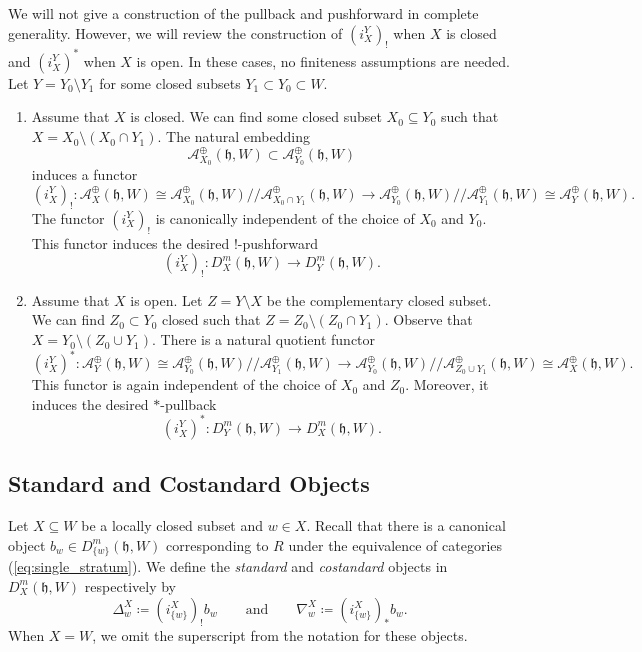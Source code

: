 \documentclass{amsart}
\newcommand{\scrA}{\mathcal{A}}
\newcommand{\BE}{D^m}
\newcommand{\fr}[1]{\mathfrak{#1}}
\theoremstyle{definition}
\begin{document}
        We will not give a construction of the pullback and pushforward in complete generality. However, we will review the construction of $(i_X^Y)_!$ when $X$ is closed and $(i_X^Y)^*$ when $X$ is open.
        In these cases, no finiteness assumptions are needed.
        Let $Y = Y_0 \setminus Y_1$ for some closed subsets $Y_1 \subset Y_0 \subset W$.
        \begin{enumerate}
                \item Assume that $X$ is closed. 
                We can find some closed subset $X_0 \subseteq Y_0$ such that $X = X_0 \setminus (X_0 \cap Y_1)$.
                The natural embedding
                \[\scrA^{\oplus}_{ X_0} (\fr{h}, W) \subset \scrA^{\oplus}_{ Y_0} (\fr{h}, W)\]
                induces a functor
                \[ (i_X^Y)_! : \scrA^{\oplus}_{ X} (\fr{h}, W) \cong \scrA^{\oplus}_{ X_0} (\fr{h}, W) /\!\!/ \scrA^{\oplus}_{ X_0 \cap Y_1} (\fr{h}, W) \to \scrA^{\oplus}_{ Y_0} (\fr{h}, W) /\!\!/ \scrA^{\oplus}_{ Y_1} (\fr{h}, W) \cong \scrA^{\oplus}_{ Y} (\fr{h}, W).\]
                The functor $(i_X^Y)_!$ is canonically independent of the choice of $X_0$ and $Y_0$.
                This functor induces the desired $!$-pushforward
                \[(i_X^Y)_! : \BE_X (\fr{h}, W) \to \BE_Y (\fr{h}, W).\] 
                \item Assume that $X$ is open. Let $Z = Y \setminus X$ be the complementary closed subset. We can find $Z_0 \subset Y_0$ closed such that $Z = Z_0 \setminus (Z_0 \cap Y_1)$. Observe that $X = Y_0 \setminus (Z_0 \cup Y_1)$.
                There is a natural quotient functor
                 \[ (i_X^Y)^* : \scrA^{\oplus}_{ Y} (\fr{h}, W) \cong \scrA^{\oplus}_{ Y_0} (\fr{h}, W) /\!\!/ \scrA^{\oplus}_{ Y_1} (\fr{h}, W) \to \scrA^{\oplus}_{ Y_0} (\fr{h}, W) /\!\!/ \scrA^{\oplus}_{ Z_0 \cup Y_1} (\fr{h}, W) \cong \scrA^{\oplus}_{ X} (\fr{h}, W).\]
                 This functor is again independent of the choice of $X_0$ and $Z_0$. Moreover, it induces the desired $*$-pullback
                  \[(i_X^Y)^* : \BE_Y (\fr{h}, W) \to \BE_X (\fr{h}, W).\] 
        \end{enumerate}

        \subsection{Standard and Costandard Objects}

        Let $X \subseteq W$ be a locally closed subset and $w \in X$.
        Recall that there is a canonical object $b_w \in \BE_{\{w\}} (\fr{h}, W)$ corresponding to $R$ under the equivalence of categories (\ref{eq:single_stratum}).
        We define the \emph{standard} and \emph{costandard} objects in $\BE_X (\fr{h}, W)$ respectively by
        \[\Delta_w^X \coloneq (i_{\{w\}}^X)_! b_w \qquad\text{and}\qquad \nabla_w^X \coloneq (i_{\{w\}}^X)_* b_w.\]
        When $X = W$, we omit the superscript from the notation for these objects.
        
\end{document}
